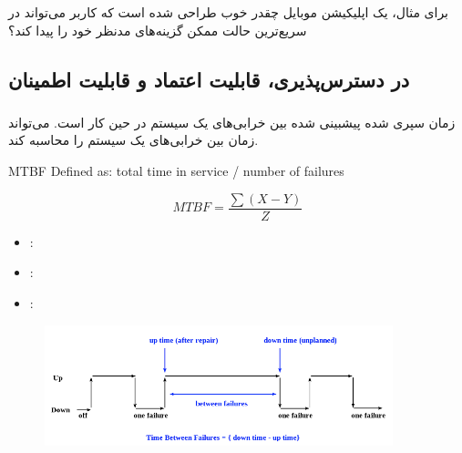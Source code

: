 \documentclass[a4paper]{article}
\begin{document}
برای مثال،  یک اپلیکیشن موبایل چقدر خوب طراحی شده است که
کاربر می‌تواند در سریع‌ترین حالت ممکن گزینه‌های مدنظر خود را پیدا کند؟

\subsection{در دسترس‌پذیری، قابلیت اعتماد و قابلیت اطمینان}

\subsubsection{}

زمان سپری شده پیشبینی شده بین خرابی‌های یک سیستم در حین کار است. 
می‌تواند زمان بین خرابی‌های یک سیستم را محاسبه کند.

\begin{LTR}
    MTBF Defined as: total time in service / number of failures
\end{LTR}

\begin{equation}
    MTBF = \frac{\sum(X - Y)}{Z}
\end{equation}

\begin{itemize}
    \item {}: 
    \item {}: 
    \item {}: 
\end{itemize}

\begin{figure}[H]
    \centering
    \includegraphics[width=0.9\textwidth]{images/mtbf.png}
    \caption{}
    \label{fig:MTBFDiagram}
\end{figure}

\subsubsection{}
\end{document}
